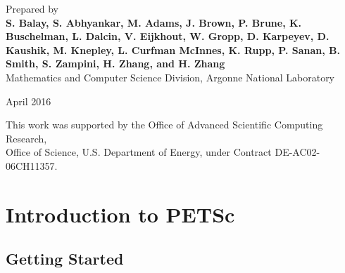 \vspace*{1in}
\noindent Prepared by \\
{\bf S. Balay, S. Abhyankar, M. Adams, J. Brown, P. Brune, K. Buschelman, L. Dalcin, V. Eijkhout, W. Gropp, D. Karpeyev,
D. Kaushik, M. Knepley, L. Curfman McInnes, K. Rupp, P. Sanan, B. Smith, S. Zampini, H. Zhang, and H. Zhang}\\
Mathematics and Computer Science Division, Argonne National Laboratory

\vspace*{30pt}
\noindent April 2016

\vspace*{20pt}
\noindent This work was supported by the Office of Advanced Scientific Computing Research, \\
Office of Science, U.S. Department of Energy, under Contract DE-AC02-06CH11357.


\cleardoublepage
\pagestyle{fancy}
\vspace{1in}
\date{\today}



\cleardoublepage



\medskip \medskip

\cleardoublepage




\cleardoublepage
\label{tableofcontents}
\tableofcontents

\cleardoublepage
\part{Introduction to PETSc}
\label{part_intro}
\cleardoublepage
\chapter{Getting Started}


\cleardoublepage
